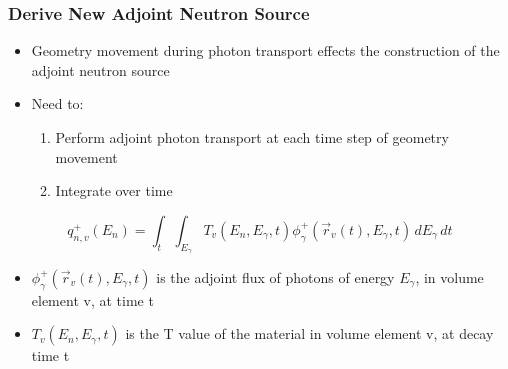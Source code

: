 \documentclass{beamer}
\begin{document}
\begin{frame}
\frametitle{Derive New Adjoint Neutron Source}
	\begin{itemize}
		\item{Geometry movement during photon transport effects the
			construction of the adjoint neutron source}
		\item{Need to:}
			\begin{enumerate}
				\item{Perform adjoint photon transport at each
					time step of geometry movement}
				\item{Integrate over time}
			\end{enumerate}
	\end{itemize}

  \begin{equation}\label{eq:adj_src_1_avg}
	 q_{n,v}^{+}(E_{n}) =
	 \int_{t}  \int_{E_{\gamma}}
	 T_{v}(E_n, E_{\gamma}, t) 
	 \phi_{\gamma}^{+}(\overrightarrow{r}_{v}(t), E_{\gamma},t)
	 \, dE_{\gamma} \, dt
  \end{equation}

\begin{itemize}
\item{$\phi_{\gamma}^{+}(\overrightarrow{r}_{v}(t), E_{\gamma},t) $ is the 
adjoint flux of photons of energy $E_{\gamma}$, in volume element v, at time t}
\item{$T_{v}(E_n, E_{\gamma}, t) $ is the T value of the material in volume
		element v, at decay time t}
\end{itemize}
\end{frame}
\end{document}

